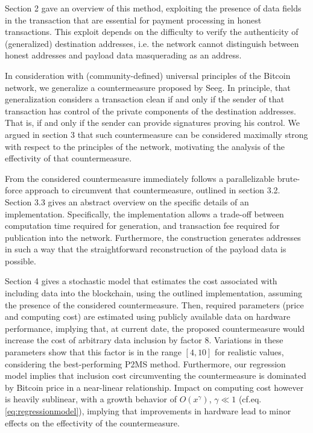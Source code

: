\documentclass[a4paper,11pt,titlepage]{scrbook}
\begin{document}
Section 2 gave an overview of this method, exploiting the presence of data fields in the transaction that are essential for payment processing in honest transactions.
This exploit depends on the difficulty to verify the authenticity of (generalized) destination addresses, i.e. the network cannot distinguish between honest addresses and payload data masquerading as an address.

In consideration with (community-defined) universal principles of the Bitcoin network, we generalize a countermeasure proposed by Seeg.
In principle, that generalization considers a transaction clean if and only if the sender of that transaction has control of the private components of the destination addresses.
That is, if and only if the sender can provide signatures proving his control.
We argued in section 3 that such countermeasure can be considered maximally strong with respect to the principles of the network, motivating the analysis of the effectivity of that countermeasure.

From the considered countermeasure immediately follows a parallelizable brute-force approach to circumvent that countermeasure, outlined in section 3.2. Section 3.3 gives an abstract overview on the specific details of an implementation.
Specifically, the implementation allows a trade-off between computation time required for generation, and transaction fee required for publication into the network.
Furthermore, the construction generates addresses in such a way that the straightforward reconstruction of the payload data is possible.

Section 4 gives a stochastic model that estimates the cost associated with including data into the blockchain, using the outlined implementation, assuming the presence of the considered countermeasure.
Then, required parameters (price and computing cost) are estimated using publicly available data on hardware performance, implying that, at current date, the proposed countermeasure would increase the cost of arbitrary data inclusion by factor 8.
Variations in these parameters show that this factor is in the range $[4, 10]$ for realistic values, considering the best-performing P2MS method.
Furthermore, our regression model implies that inclusion cost circumventing the countermeasure is dominated by Bitcoin price in a near-linear relationship.
Impact on computing cost however is heavily sublinear, with a growth behavior of $O(x^\gamma)$, $\gamma \ll 1$ (cf.\@ eq.\@ \ref{eq:regressionmodel}), implying that improvements in hardware lead to minor effects on the effectivity of the countermeasure.
\end{document}
